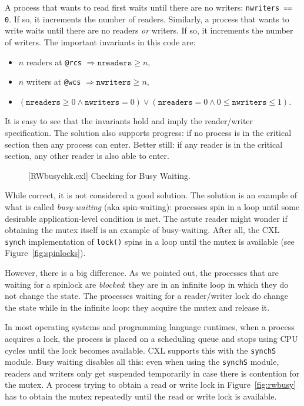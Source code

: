\documentclass{report}
\newenvironment{code}{
\tcolorbox
}{
\endtcolorbox
}
\begin{document}
A process that wants to read first waits until there are no writers:
\texttt{nwriters == 0}.  If so, it increments the number of readers.
Similarly, a
process that wants to write waits until there are no readers \emph{or} writers.
If so, it increments the number of writers.
The important invariants in this code are:
\begin{itemize}
\item $n$ readers at \texttt{@rcs} $\Rightarrow \mathtt{nreaders} \ge n$,
\item $n$ writers at \texttt{@wcs} $\Rightarrow \mathtt{nwriters} \ge n$,
\item $(\mathtt{nreaders} \ge 0 \land \mathtt{nwriters} = 0) \lor
    (\mathtt{nreaders} = 0 \land 0 \le \mathtt{nwriters} \le 1)$.
\end{itemize}
It is easy to see that the invariants hold and imply the reader/writer
specification.
The solution also supports progress: if no process is in the critical
section then any process can enter.  Better still: if any reader is in the
critical section, any other reader is also able to enter.

\begin{figure}
\begin{code}
\end{code}
\caption{[RWbusychk.cxl] Checking for Busy Waiting.}
\label{fig:rwblock}
\end{figure}

While correct, it is not considered a good solution.
The solution is an example of what is called \emph{busy-waiting}
(aka spin-waiting):
processes spin in a loop until some desirable application-level condition is met.
The astute reader might wonder if obtaining the mutex itself is an
example of busy-waiting.  After all, the CXL \texttt{synch} implementation
of \texttt{lock()} spins in a loop until the mutex is available
(see Figure~\ref{fig:spinlocks}).

However, there is a big difference.  As we pointed out, the processes that
are waiting for a spinlock are \emph{blocked}: they are in an infinite loop
in which they do not change the state.
The processes waiting for a reader/writer lock do change the state while
in the infinite loop: they acquire the mutex and release it.

In most operating systems and programming language runtimes,
when a process acquires a lock, the process is placed on a scheduling
queue and stops using CPU cycles until the lock becomes available.
CXL supports this with the \texttt{synchS} module.
Busy waiting disables all this: even when using the \texttt{synchS}
module, readers and writers only get suspended temporarily in case
there is contention for the mutex.
A process trying to obtain a read or write lock in
Figure~\ref{fig:rwbusy} has to obtain the mutex repeatedly
until the read or write lock is available.
\end{document}
